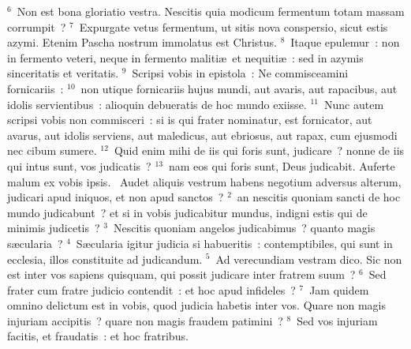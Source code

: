 ${}^{6}$~Non est bona gloriatio vestra. Nescitis quia modicum fermentum totam massam corrumpit~?
${}^{7}$~Expurgate vetus fermentum, ut sitis nova conspersio, sicut estis azymi. Etenim Pascha nostrum immolatus est Christus.
${}^{8}$~Itaque epulemur~: non in fermento veteri, neque in fermento maliti\ae\ et nequiti\ae~: sed in azymis sinceritatis et veritatis.
${}^{9}$~Scripsi vobis in epistola~: Ne commisceamini fornicariis~:
${}^{10}$~non utique fornicariis hujus mundi, aut avaris, aut rapacibus, aut idolis servientibus~: alioquin debueratis de hoc mundo exiisse.
${}^{11}$~Nunc autem scripsi vobis non commisceri~: si is qui frater nominatur, est fornicator, aut avarus, aut idolis serviens, aut maledicus, aut ebriosus, aut rapax, cum ejusmodi nec cibum sumere.
${}^{12}$~Quid enim mihi de iis qui foris sunt, judicare~? nonne de iis qui intus sunt, vos judicatis~?
${}^{13}$~nam eos qui foris sunt, Deus judicabit. Auferte malum ex vobis ipsis.
~Audet aliquis vestrum habens negotium adversus alterum, judicari apud iniquos, et non apud sanctos~?
${}^{2}$~an nescitis quoniam sancti de hoc mundo judicabunt~? et si in vobis judicabitur mundus, indigni estis qui de minimis judicetis~?
${}^{3}$~Nescitis quoniam angelos judicabimus~? quanto magis s\ae cularia~?
${}^{4}$~S\ae cularia igitur judicia si habueritis~: contemptibiles, qui sunt in ecclesia, illos constituite ad judicandum.
${}^{5}$~Ad verecundiam vestram dico. Sic non est inter vos sapiens quisquam, qui possit judicare inter fratrem suum~?
${}^{6}$~Sed frater cum fratre judicio contendit~: et hoc apud infideles~?
${}^{7}$~Jam quidem omnino delictum est in vobis, quod judicia habetis inter vos. Quare non magis injuriam accipitis~? quare non magis fraudem patimini~?
${}^{8}$~Sed vos injuriam facitis, et fraudatis~: et hoc fratribus.


